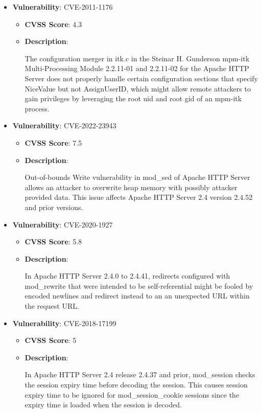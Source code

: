 \documentclass{article}
\begin{document}
\begin{itemize}
        \item \textbf{Vulnerability}: CVE-2011-1176
        \begin{itemize}
            \item \textbf{CVSS Score}:  4.3 
            \item \textbf{Description}:
            \parbox[t]{0.9\linewidth}{
                \ttfamily The configuration merger in itk.c in the Steinar H. Gunderson mpm-itk Multi-Processing Module 2.2.11-01 and 2.2.11-02 for the Apache HTTP Server does not properly handle certain configuration sections that specify NiceValue but not AssignUserID, which might allow remote attackers to gain privileges by leveraging the root uid and root gid of an mpm-itk process.
            }
        \end{itemize}
    
        \item \textbf{Vulnerability}: CVE-2022-23943
        \begin{itemize}
            \item \textbf{CVSS Score}:  7.5 
            \item \textbf{Description}:
            \parbox[t]{0.9\linewidth}{
                \ttfamily Out-of-bounds Write vulnerability in mod\_sed of Apache HTTP Server allows an attacker to overwrite heap memory with possibly attacker provided data. This issue affects Apache HTTP Server 2.4 version 2.4.52 and prior versions.
            }
        \end{itemize}
    
        \item \textbf{Vulnerability}: CVE-2020-1927
        \begin{itemize}
            \item \textbf{CVSS Score}:  5.8 
            \item \textbf{Description}:
            \parbox[t]{0.9\linewidth}{
                \ttfamily In Apache HTTP Server 2.4.0 to 2.4.41, redirects configured with mod\_rewrite that were intended to be self-referential might be fooled by encoded newlines and redirect instead to an an unexpected URL within the request URL.
            }
        \end{itemize}
    
        \item \textbf{Vulnerability}: CVE-2018-17199
        \begin{itemize}
            \item \textbf{CVSS Score}:  5 
            \item \textbf{Description}:
            \parbox[t]{0.9\linewidth}{
                \ttfamily In Apache HTTP Server 2.4 release 2.4.37 and prior, mod\_session checks the session expiry time before decoding the session. This causes session expiry time to be ignored for mod\_session\_cookie sessions since the expiry time is loaded when the session is decoded.
            }
        \end{itemize}
    

\end{itemize}
\end{document}
